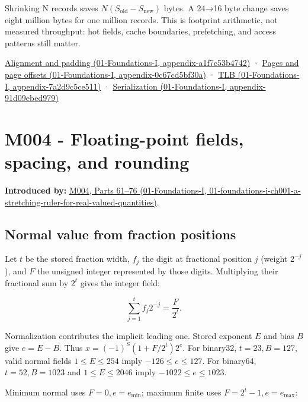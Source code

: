 Shrinking N records saves \(N(S_{\mathrm{old}}-S_{\mathrm{new}})\) bytes. A 24→16 byte change saves eight million bytes for one million records. This is footprint arithmetic, not measured throughput: hot fields, cache boundaries, prefetching, and access patterns still matter.

\href{../01-Foundations-I/main.pdf\#nameddest=appendix-a1f7c53b4742}{Alignment and padding (01-Foundations-I, appendix-a1f7c53b4742)} · \href{../01-Foundations-I/main.pdf\#nameddest=appendix-0c67cd5bf30a}{Pages and page offsets (01-Foundations-I, appendix-0c67cd5bf30a)} · \href{../01-Foundations-I/main.pdf\#nameddest=appendix-7a2d9c5ce511}{TLB (01-Foundations-I, appendix-7a2d9c5ce511)} · \href{../01-Foundations-I/main.pdf\#nameddest=appendix-91d09ebed979}{Serialization (01-Foundations-I, appendix-91d09ebed979)}

\section{M004 - Floating-point fields, spacing, and rounding}\label{03-visual-computing-i-ch018-m004---floating-point-fields-spacing-and-rounding}

\textbf{Introduced by:} \href{../01-Foundations-I/main.pdf\#nameddest=01-foundations-i-ch001-a-stretching-ruler-for-real-valued-quantities}{M004, Parts 61--76 (01-Foundations-I, 01-foundations-i-ch001-a-stretching-ruler-for-real-valued-quantities)}.

\subsection{Normal value from fraction positions}\label{03-visual-computing-i-ch018-normal-value-from-fraction-positions}

Let \(t\) be the stored fraction width, \(f_j\) the digit at fractional position \(j\) (weight \(2^{-j}\)), and \(F\) the unsigned integer represented by those digits. Multiplying their fractional sum by \(2^t\) gives the integer field:

\[
\sum_{j=1}^{t}f_j2^{-j}=\frac{F}{2^t}.
\]

Normalization contributes the implicit leading one. Stored exponent \(E\) and bias \(B\) give \(e=E-B\). Thus \(x=(-1)^S(1+F/2^t)2^e\). For binary32, \(t=23,B=127\), valid normal fields \(1\le E\le254\) imply \(-126\le e\le127\). For binary64, \(t=52,B=1023\) and \(1\le E\le2046\) imply \(-1022\le e\le1023\).

Minimum normal uses \(F=0,e=e_{\min}\); maximum finite uses \(F=2^t-1,e=e_{\max}\):


